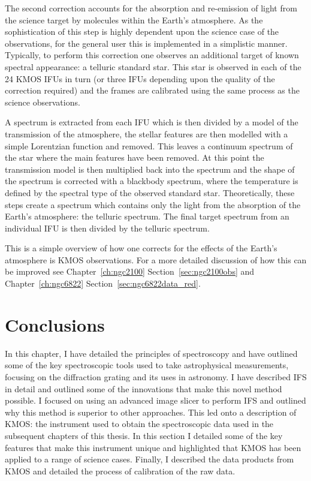 The second correction accounts for the absorption and re-emission of light from the science target by molecules within the Earth's atmosphere.
As the sophistication of this step is highly dependent upon the science case of the observations, for the general user this is implemented in a simplistic manner.
Typically, to perform this correction one observes an additional target of known spectral appearance: a telluric standard star.
This star is observed in each of the 24 KMOS IFUs in turn (or three IFUs depending upon the quality of the correction required) and the frames are calibrated using the same process as the science observations.

A spectrum is extracted from each IFU which is then divided by a model of the transmission of the atmosphere, the stellar features are then modelled with a simple Lorentzian function and removed.
This leaves a continuum spectrum of the star where the main features have been removed.
At this point the transmission model is then multiplied back into the spectrum and the shape of the spectrum is corrected with a blackbody spectrum, where the temperature is defined by the spectral type of the observed standard star.
Theoretically, these steps create a spectrum which contains only the light from the absorption of the Earth's atmosphere: the telluric spectrum.
The final target spectrum from an individual IFU is then divided by the telluric spectrum.

This is a simple overview of how one corrects for the effects of the Earth's atmosphere is KMOS observations.
For a more detailed discussion of how this can be improved see Chapter~\ref{ch:ngc2100} Section~\ref{sec:ngc2100obs} and Chapter~\ref{ch:ngc6822} Section~\ref{sec:ngc6822data_red}.


\section{Conclusions} %
\label{sec:kmosconc}

In this chapter, I have detailed the principles of spectroscopy and have outlined some of the key spectroscopic tools used to take astrophysical measurements, focusing on the diffraction grating and its uses in astronomy.
I have described IFS in detail and outlined some of the innovations that make this novel method possible.
I focused on using an advanced image slicer to perform IFS and outlined why this method is superior to other approaches.
This led onto a description of KMOS: the instrument used to obtain the spectroscopic data used in the subsequent chapters of this thesis.
In this section I detailed some of the key features that make this instrument unique and highlighted that KMOS has been applied to a range of science cases.
Finally, I described the data products from KMOS and detailed the process of calibration of the raw data.

